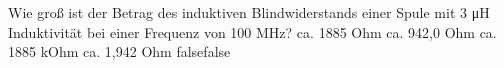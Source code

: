     {Wie groß ist der Betrag des induktiven Blindwiderstands einer Spule mit 3 μH Induktivität bei einer Frequenz von 100 MHz?}
    {ca. 1885 Ohm}
    {ca. 942,0 Ohm}
    {ca. 1885 kOhm}
    {ca. 1,942 Ohm}
    {false}{false}